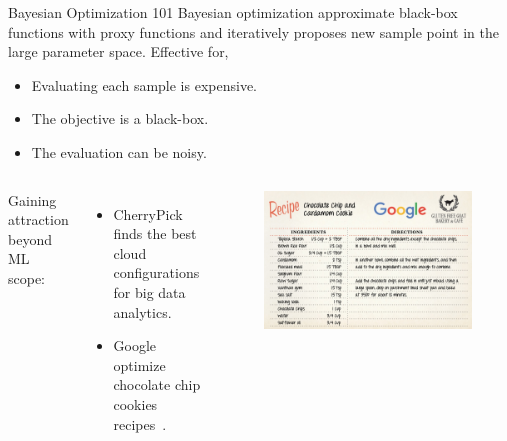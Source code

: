 \begin{frame}{Bayesian Optimization 101}
  Bayesian optimization approximate black-box functions with proxy functions and
  iteratively proposes new sample point in the large parameter space. Effective
  for,

  \pause
  \begin{itemize}
    \item Evaluating each sample is expensive.
    \item The objective is a black-box.
    \item The evaluation can be noisy.
  \end{itemize}
  \pause
  \begin{columns}
    \footnotesize
    Gaining attraction beyond ML scope:

    \begin{itemize}
    \item CherryPick~\cite{alipourfard2017cherrypick} finds the best cloud
      configurations for big data analytics.
    \item Google optimize chocolate chip cookies
      recipes~\cite{solnik2017bayesian}.
    \end{itemize}

    \pause
    \begin{figure}
      \includegraphics[width=\linewidth]{figures/google-cookie.jpg}
    \end{figure}
  \end{columns}
\end{frame}

